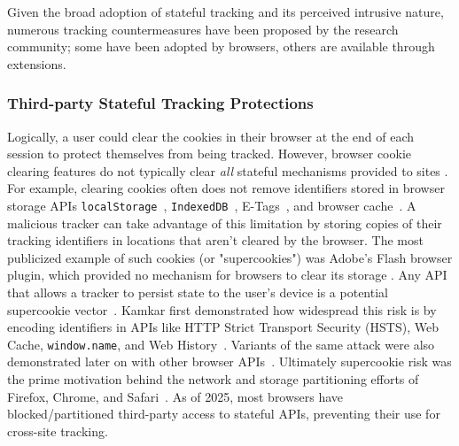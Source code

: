 Given the broad adoption of stateful tracking and its perceived intrusive nature, numerous tracking countermeasures have been proposed by the research community; some have been adopted by browsers, others are available through extensions.


\subsubsection{Third-party Stateful Tracking Protections}
\label{sec:stateful-defenses-evercookie}
Logically, a user could clear the cookies in their browser at the end of each session to protect themselves from being tracked. 
%
However, browser cookie clearing features do not typically clear \textit{all} stateful mechanisms provided to sites \cite{acarWebNeverForgets2014, englehardtOnlineTracking1millionsite2016}. 
%
For example, clearing cookies often does not remove identifiers stored in browser storage APIs \texttt{localStorage}~\cite{ayensonFlashCookiesPrivacy2011,roesnerDetectingDefendingThirdparty2012}, \texttt{IndexedDB}~\cite{acarFPDetectiveDustingWeb2013}, E-Tags~\cite{ayensonFlashCookiesPrivacy2011}, and browser cache~\cite{sorensenZombiecookiesCaseStudies2013}. 
%
A malicious tracker can take advantage of this limitation by storing copies of their tracking identifiers in locations that aren’t cleared by the browser. 
%
The most publicized example of such cookies (or "supercookies") was Adobe's Flash browser plugin, which provided no mechanism for browsers to clear its storage \cite{soltaniFlashCookiesPrivacy2009,solomosTalesFaviconsCaches2021}.
%
Any API that allows a tracker to persist state to the user’s device is a potential supercookie vector~\cite{aliNavigatingMurkyWaters2023}. 
%
%
Kamkar first demonstrated how widespread this risk is by encoding identifiers in APIs like HTTP Strict Transport Security (HSTS), Web Cache, \texttt{window.name}, and Web History~\cite{kamkarSamyKamkarEvercookie2010}. 
%
Variants of the same attack were also demonstrated later on with other browser APIs~\cite{klink1334485TrackingUsing2017,goodinUnpatchedBrowserWeaknesses2015,evansPublicKeyPinning2015}. 
%
Ultimately supercookie risk was the prime motivation behind the network and storage partitioning efforts of Firefox, Chrome, and Safari~\cite{menkeStorageIsolationProject2020,privacycommunitygroupClientSideStoragePartitioning2022,mdnStatePartitioningPrivacy2024}. 
%
As of 2025, most browsers have blocked/partitioned third-party access to stateful APIs, preventing their use for cross-site tracking.

